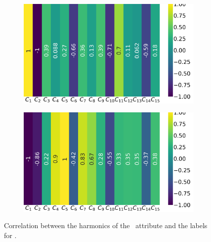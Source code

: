 \begin{figure}[!ht]
\begin{subfigure}{0.49\linewidth}
	\end{subfigure}
	\begin{subfigure}{0.49\linewidth}
		\includegraphics[width=\linewidth]{img/qlp_corr/Cnmod_coil2.png}
	\end{subfigure}
	\begin{subfigure}{0.49\linewidth}
		\includegraphics[width=\linewidth]{img/qlp_corr/Cnmod_coil3.png}
	\end{subfigure}
	\caption{Correlation between the harmonics of the \cnmod\ attribute and the labels for \qlp.}
	\label{fig:cnmod-lcorr-qlp}
\end{figure}


